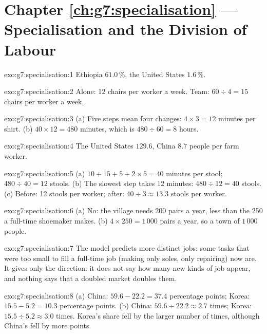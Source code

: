 \section*{Chapter \ref{ch:g7:specialisation} --- Specialisation and the Division of Labour}

\begin{solution}{exo:g7:specialisation:1}
Ethiopia $61.0\,\%$, the United States $1.6\,\%$.
\end{solution}

\begin{solution}{exo:g7:specialisation:2}
Alone: 12 chairs per worker a week. Team: $60 \div 4 = 15$ chairs per worker a week.
\end{solution}

\begin{solution}{exo:g7:specialisation:3}
(a) Five steps mean four changes: $4 \times 3 = 12$ minutes per shirt. (b) $40 \times 12
= 480$ minutes, which is $480 \div 60 = 8$ hours.
\end{solution}

\begin{solution}{exo:g7:specialisation:4}
The United States $129.6$, China $8.7$ people per farm worker.
\end{solution}

\begin{solution}{exo:g7:specialisation:5}
(a) $10 + 15 + 5 + 2 \times 5 = 40$ minutes per stool; $480 \div 40 = 12$ stools.
(b) The slowest step takes 12 minutes: $480 \div 12 = 40$ stools. (c) Before: 12 stools
per worker; after: $40 \div 3 \approx 13.3$ stools per worker.
\end{solution}

\begin{solution}{exo:g7:specialisation:6}
(a) No: the village needs 200 pairs a year, less than the 250 a full-time shoemaker
makes. (b) $4 \times 250 = 1\,000$ pairs a year, so a town of $1\,000$ people.
\end{solution}

\begin{solution}{exo:g7:specialisation:7}
The model predicts more distinct jobs: some tasks that were too small to fill a
full-time job (making only soles, only repairing) now are. It gives only the
direction: it does not say how many new kinds of job appear, and nothing says that a
doubled market doubles them.
\end{solution}

\begin{solution}{exo:g7:specialisation:8}
(a) China: $59.6 - 22.2 = 37.4$ percentage points; Korea: $15.5 - 5.2 = 10.3$
percentage points. (b) China: $59.6 \div 22.2 \approx 2.7$ times; Korea: $15.5 \div 5.2
\approx 3.0$ times. Korea's share fell by the larger number of times, although China's
fell by more points.
\end{solution}

